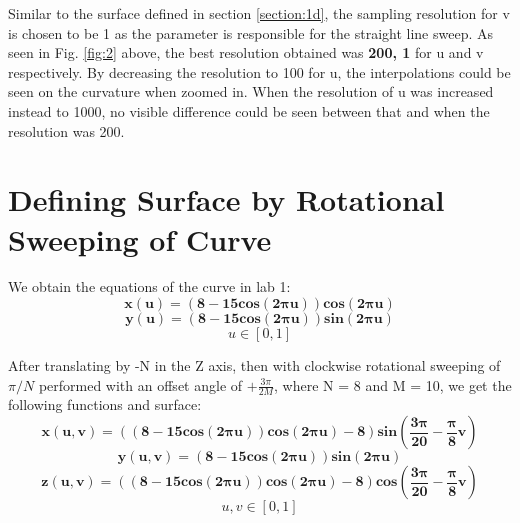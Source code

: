 \documentclass[acmlarge,nonacm=true]{acmart}
\begin{document}
Similar to the surface defined in section \ref{section:1d}, the sampling resolution for v is chosen to be 1 as the parameter is responsible for the straight line sweep.
 As seen in Fig. \ref{fig:2} above, the best resolution obtained was \textbf{200, 1} for u and v respectively.
By decreasing the resolution to 100 for u, the interpolations could be seen on the curvature when zoomed in. When the resolution of u was 
increased instead to 1000, no visible difference could be seen between that and when the resolution was 200.

\section{Defining Surface by Rotational Sweeping of Curve}
We obtain the equations of the curve in lab 1:
\begin{displaymath}
	\mathbf{x(u) =  (8 - 15cos(2\pi u))cos(2\pi u)}
\end{displaymath}
\begin{displaymath}
	\mathbf{y(u) =  (8 - 15cos(2\pi u))sin(2\pi u)}
\end{displaymath}
\begin{displaymath}
	u \in [0, 1]
\end{displaymath}

After translating by -N in the Z axis, then with clockwise rotational sweeping of \(\pi/N\) performed with an offset angle
of \(+\frac{3\pi}{2M}\), where N = 8 and M = 10, we get the following functions and surface:\\


\begin{displaymath}
	\mathbf{x(u,v) =  ((8 - 15cos(2\pi u))cos(2\pi u)-8)sin(\frac{3\pi}{20} - \frac{\pi}{8}v)}
\end{displaymath}
\begin{displaymath}
	\mathbf{y(u,v) =  (8 - 15cos(2\pi u))sin(2\pi u)}
\end{displaymath}
\begin{displaymath}
	\mathbf{z(u,v) =  ((8 - 15cos(2\pi u))cos(2\pi u)-8)cos(\frac{3\pi}{20} - \frac{\pi}{8}v)}
\end{displaymath}
\begin{displaymath}
	u,v \in [0, 1]
\end{displaymath}
\end{document}
